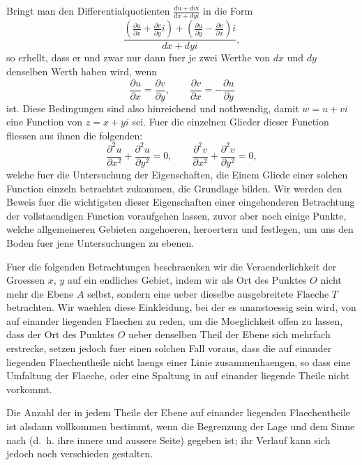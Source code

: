 \documentclass[11pt,a4paper]{article}
\theoremstyle{plain}
\theoremstyle{definition}
\begin{document}
Bringt man den Differentialquotienten $\frac{du + dvi}{dx + dyi}$ in die Form
\[
\frac{\left(\frac{\partial u}{\partial x} + \frac{\partial v}{\partial y}i\right) + \left(\frac{\partial u}{\partial y} - \frac{\partial v}{\partial x}\right)i}{dx + dyi},
\]
so erhellt, dass er und zwar nur dann fuer je zwei Werthe von $dx$ und $dy$ denselben Werth haben wird, wenn
\begin{equation}\label{eq:cauchy-riemann}
\frac{\partial u}{\partial x} = \frac{\partial v}{\partial y}, \qquad \frac{\partial v}{\partial x} = -\frac{\partial u}{\partial y}
\end{equation}
ist. Diese Bedingungen sind also hinreichend und nothwendig, damit $w = u + vi$ eine Function von $z = x + yi$ sei. Fuer die einzelnen Glieder dieser Function fliessen aus ihnen die folgenden:
\begin{equation}
\frac{\partial^2 u}{\partial x^2} + \frac{\partial^2 u}{\partial y^2} = 0, \qquad \frac{\partial^2 v}{\partial x^2} + \frac{\partial^2 v}{\partial y^2} = 0,
\end{equation}
welche fuer die Untersuchung der Eigenschaften, die Einem Gliede einer solchen Function einzeln betrachtet zukommen, die Grundlage bilden. Wir werden den Beweis fuer die wichtigsten dieser Eigenschaften einer eingehenderen Betrachtung der vollstaendigen Function voraufgehen lassen, zuvor aber noch einige Punkte, welche allgemeineren Gebieten angehoeren, heroertern und festlegen, um uns den Boden fuer jene Untersuchungen zu ebenen.

Fuer die folgenden Betrachtungen beschraenken wir die Veraenderlichkeit der Groessen $x$, $y$ auf ein endliches Gebiet, indem wir als Ort des Punktes $O$ nicht mehr die Ebene $A$ selbst, sondern eine ueber dieselbe ausgebreitete Flaeche $T$ betrachten. Wir waehlen diese Einkleidung, bei der es unanstoessig sein wird, von auf einander liegenden Flaechen zu reden, um die Moeglichkeit offen zu lassen, dass der Ort des Punktes $O$ ueber denselben Theil der Ebene sich mehrfach erstrecke, setzen jedoch fuer einen solchen Fall voraus, dass die auf einander liegenden Flaechentheile nicht laengs einer Linie zusammenhaengen, so dass eine Umfaltung der Flaeche, oder eine Spaltung in auf einander liegende Theile nicht vorkommt.

Die Anzahl der in jedem Theile der Ebene auf einander liegenden Flaechentheile ist alsdann vollkommen bestimmt, wenn die Begrenzung der Lage und dem Sinne nach (d.\ h. ihre innere und aussere Seite) gegeben ist; ihr Verlauf kann sich jedoch noch verschieden gestalten.
\end{document}
